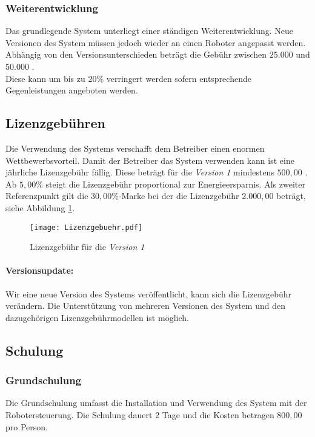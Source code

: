 \subsubsection{Weiterentwicklung}
Das grundlegende System unterliegt einer ständigen Weiterentwicklung. Neue Versionen des System müssen jedoch wieder an einen Roboter angepasst werden. Abhängig von den Versionsunterschieden beträgt die Gebühr zwischen $25.000$ und $50.000$ \officialeuro.\\
Diese kann um bis zu $20$\% verringert werden sofern entsprechende Gegenleistungen angeboten werden.

\subsection{Lizenzgebühren}
Die Verwendung des Systems verschafft dem Betreiber einen enormen Wettbewerbsvorteil. Damit der Betreiber das System verwenden kann ist eine jährliche Lizenzgebühr fällig. Diese beträgt für die \textit{Version 1} mindestens $500,00$ \officialeuro. Ab $5,00$\% steigt die Lizenzgebühr proportional zur Energieersparnis. Als zweiter Referenzpunkt gilt die $30,00$\%-Marke bei der die Lizenzgebühr $2.000,00$ \officialeuro beträgt, siehe Abbildung \ref{fig:lizenzgebuehr}.
\begin{figure}[h]
	\centering
	\texttt{[image: Lizenzgebuehr.pdf]}
	\caption{Lizenzgebühr für die \textit{Version 1}}
	\label{fig:lizenzgebuehr}
\end{figure}

\paragraph*{Versionsupdate:}
Wir eine neue Version des Systems veröffentlicht, kann sich die Lizenzgebühr verändern. Die Unterstützung von mehreren Versionen des System und den dazugehörigen Lizenzgebührmodellen ist möglich.

\subsection{Schulung}
\subsubsection{Grundschulung}
Die Grundschulung umfasst die Installation und Verwendung des System mit der Robotersteuerung. Die Schulung dauert 2 Tage und die Kosten betragen $800,00$ \officialeuro pro Person.

